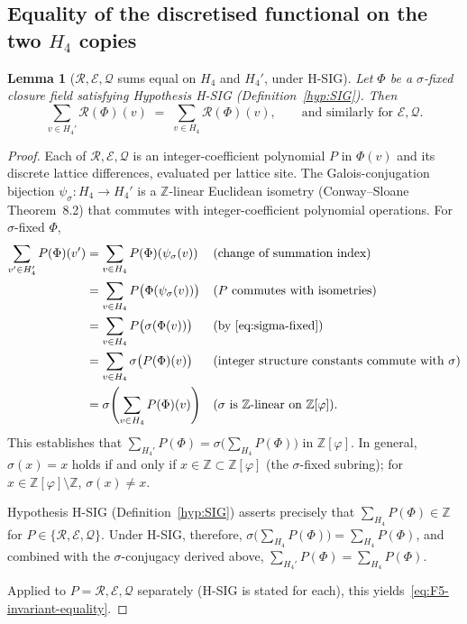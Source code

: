 \documentclass[12pt]{article}
\newtheorem{lemma}[theorem]{Lemma}
\theoremstyle{definition}
\theoremstyle{remark}
\newcommand{\Zphi}{\mathbb{Z}[\varphi]}
\begin{document}
\subsection{Equality of the discretised functional on the two $H_4$ copies}

\begin{lemma}[$\mathcal R, \mathcal E, \mathcal Q$ sums equal on $H_4$ and $H_4'$, under H-SIG]\label{lem:F5-invariants}
Let $\Phi$ be a $\sigma$-fixed closure field satisfying Hypothesis H-SIG (Definition~\ref{hyp:SIG}). Then
\begin{equation}\label{eq:F5-invariant-equality}
\sum_{v \in H_4'} \mathcal R(\Phi)(v) \;=\; \sum_{v \in H_4} \mathcal R(\Phi)(v), \qquad \text{and similarly for } \mathcal E, \mathcal Q.
\end{equation}
\end{lemma}

\begin{proof}
Each of $\mathcal R, \mathcal E, \mathcal Q$ is an integer-coefficient polynomial $P$ in $\Phi(v)$ and its discrete lattice differences, evaluated per lattice site. The Galois-conjugation bijection $\psi_\sigma : H_4 \to H_4'$ is a $\mathbb{Z}$-linear Euclidean isometry (Conway--Sloane Theorem~8.2) that commutes with integer-coefficient polynomial operations. For $\sigma$-fixed $\Phi$,
\begin{align}
\sum_{v' \in H_4'} P(\Phi)(v') &= \sum_{v \in H_4} P(\Phi)(\psi_\sigma(v)) && \text{(change of summation index)}\\
&= \sum_{v \in H_4} P\bigl(\Phi(\psi_\sigma(v))\bigr) && \text{($P$ commutes with isometries)}\\
&= \sum_{v \in H_4} P\bigl(\sigma(\Phi(v))\bigr) && \text{(by \eqref{eq:sigma-fixed})}\\
&= \sum_{v \in H_4} \sigma\bigl(P(\Phi)(v)\bigr) && \text{(integer structure constants commute with } \sigma\text{)}\\
&= \sigma\!\left(\sum_{v \in H_4} P(\Phi)(v)\right) && \text{($\sigma$ is } \mathbb{Z}\text{-linear on } \Zphi\text{).}
\end{align}
This establishes that $\sum_{H_4'} P(\Phi) = \sigma\bigl(\sum_{H_4} P(\Phi)\bigr)$ in $\Zphi$. In general, $\sigma(x) = x$ holds if and only if $x \in \mathbb{Z} \subset \Zphi$ (the $\sigma$-fixed subring); for $x \in \Zphi \setminus \mathbb{Z}$, $\sigma(x) \neq x$.

Hypothesis H-SIG (Definition~\ref{hyp:SIG}) asserts precisely that $\sum_{H_4} P(\Phi) \in \mathbb{Z}$ for $P \in \{\mathcal R, \mathcal E, \mathcal Q\}$. Under H-SIG, therefore, $\sigma\bigl(\sum_{H_4} P(\Phi)\bigr) = \sum_{H_4} P(\Phi)$, and combined with the $\sigma$-conjugacy derived above, $\sum_{H_4'} P(\Phi) = \sum_{H_4} P(\Phi)$.

Applied to $P = \mathcal R, \mathcal E, \mathcal Q$ separately (H-SIG is stated for each), this yields~\eqref{eq:F5-invariant-equality}.
\end{proof}
\end{document}
